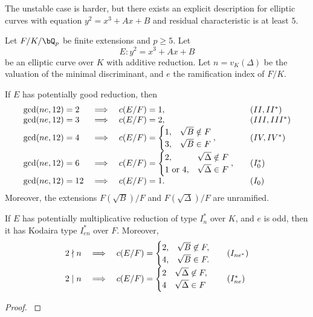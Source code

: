 The unstable case is harder, but there exists an explicit description for elliptic curves with equation $y^2=x^3+Ax+B$ and residual characteristic is at least $5$. 

\begin{lemma}\label{lem_add_tam}
    Let $F /K / \bQ_p$ be finite extensions and $p \geq 5$. Let 
    $$E:  y^2 = x^3 + Ax + B$$
    be an elliptic curve over $K$ with additive reduction. Let $n=v_K(\Delta)$ be the valuation of the minimal discriminant, and $e$ the ramification index of $F/K$.

    If $E$ has potentially good reduction, then 
        \[
        \begin{array}{l l l l}
            \gcd(ne, 12) = 2 & \implies & c(E / F) = 1, & \quad (II, II^*) \\
            \gcd(ne, 12) = 3 & \implies & c(E / F) = 2, & \quad (III, III^*) \\
            \gcd(ne, 12) = 4 & \implies & c(E / F) = \begin{cases} 1, & \sqrt{B} \notin F
                                \\ 3, & \sqrt{B} \in F \end{cases}, & \quad (IV, IV^*) \\
            \gcd(ne, 12) = 6 & \implies & c(E / F) = \begin{cases} 2, & \sqrt{\Delta} \notin F
                \\ 1 \ \text{or} \ 4, & \sqrt{\Delta} \in F \end{cases}, & \quad (I_0^*) \\
            \gcd(ne, 12) = 12 & \implies & c(E / F) = 1. & \quad (I_0)
        \end{array}
        \]
    Moreover, the extensions $F\left(\sqrt{B}\right) / F$ and $F\left(\sqrt{\Delta}\right) / F$ are unramified.

    If $E$ has potentially multiplicative reduction of type $I_n^*$ over $K$, and $e$ is odd, then it has Kodaira type $I_{en}^*$ over $F$. Moreover, 
    \[
        \begin{array}{l l l l}
        2 \nmid n & \implies & c(E / F) = \begin{cases} 2, & \sqrt{B} \not\in F, \\ 4, & \sqrt{B} \in F. \end{cases} & \quad (I_{ne^*}) \\
        2 \mid n & \implies & c(E / F) = \begin{cases} 2 & \sqrt{\Delta} \not\in F, \\ 4 & \sqrt{\Delta} \in F \end{cases} & \quad ({I_{ne}^*})   
        \end{array} 
    \]
\end{lemma}

\begin{proof}
    \cite[Lemma 3.22]{reg-const}
\end{proof}

